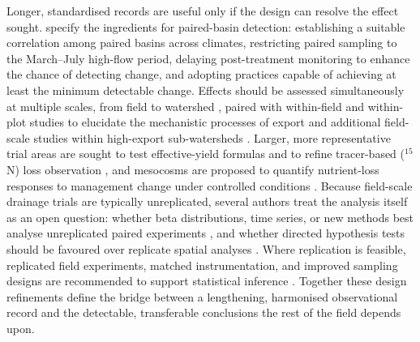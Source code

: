 Longer, standardised records are useful only if the design can resolve the
effect sought. \textcite{Schilling2013} specify the ingredients for
paired-basin detection: establishing a suitable correlation among paired
basins across climates, restricting paired sampling to the March--July
high-flow period, delaying post-treatment monitoring to enhance the chance
of detecting change, and adopting practices capable of achieving at least
the minimum detectable change. Effects should be assessed simultaneously at
multiple scales, from field to watershed \parencite{Sunohara2016}, paired
with within-field and within-plot studies to elucidate the mechanistic
processes of export and additional field-scale studies within high-export
sub-watersheds \parencite{Irvine2019}. Larger, more representative trial
areas are sought to test effective-yield formulas \parencite{Xin2016c} and
to refine tracer-based ($^{15}$N) loss observation \parencite{Xiong2025},
and mesocosms are proposed to quantify nutrient-loss responses to
management change under controlled conditions \parencite{Loper2024}.
Because field-scale drainage trials are typically unreplicated, several
authors treat the analysis itself as an open question: whether beta
distributions, time series, or new methods best analyse unreplicated paired
experiments \parencite{Pagliari2021}, and whether directed hypothesis tests
should be favoured over replicate spatial analyses \parencite{Andrus2014}.
Where replication is feasible, replicated field experiments, matched
instrumentation, and improved sampling designs are recommended to support
statistical inference
\parencite{Okuda2020,Wamono2016b,Davis2019,Jacquemin2020}. Together these
design refinements define the bridge between a lengthening, harmonised
observational record and the detectable, transferable conclusions the rest
of the field depends upon.